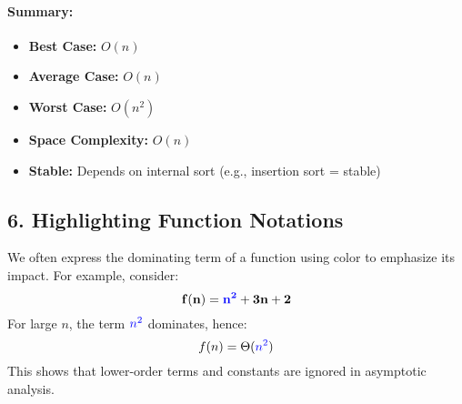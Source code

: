 \paragraph{Summary:}
\begin{itemize}
  \item \textbf{Best Case:} \( O(n) \)
  \item \textbf{Average Case:} \( O(n) \)
  \item \textbf{Worst Case:} \( O(n^2) \)
  \item \textbf{Space Complexity:} \( O(n) \)
  \item \textbf{Stable:} Depends on internal sort (e.g., insertion sort = stable)
\end{itemize}

\subsection*{\large \textbf{6. Highlighting Function Notations}}

We often express the dominating term of a function using color to emphasize its impact. For example, consider:
\[
\mathbf{f(n) = \textcolor{blue}{n^2} + 3n + 2}
\]
For large \( n \), the term \(\textcolor{blue}{n^2}\) dominates, hence:
\[
f(n) = \Theta(\textcolor{blue}{n^2})
\]
This shows that lower-order terms and constants are ignored in asymptotic analysis.